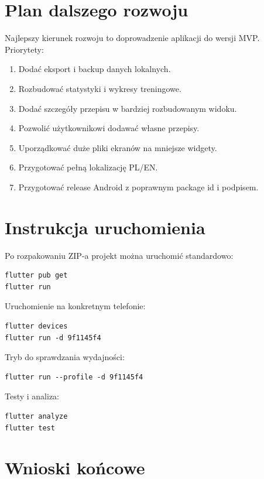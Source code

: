 \documentclass[12pt,a4paper]{article}
\begin{document}
\section{Plan dalszego rozwoju}

Najlepszy kierunek rozwoju to doprowadzenie aplikacji do wersji MVP. Priorytety:

\begin{enumerate}
    \item Dodać eksport i backup danych lokalnych.
    \item Rozbudować statystyki i wykresy treningowe.
    \item Dodać szczegóły przepisu w bardziej rozbudowanym widoku.
    \item Pozwolić użytkownikowi dodawać własne przepisy.
    \item Uporządkować duże pliki ekranów na mniejsze widgety.
    \item Przygotować pełną lokalizację PL/EN.
    \item Przygotować release Android z poprawnym package id i podpisem.
\end{enumerate}

\section{Instrukcja uruchomienia}

Po rozpakowaniu ZIP-a projekt można uruchomić standardowo:

\begin{verbatim}
flutter pub get
flutter run
\end{verbatim}

Uruchomienie na konkretnym telefonie:

\begin{verbatim}
flutter devices
flutter run -d 9f1145f4
\end{verbatim}

Tryb do sprawdzania wydajności:

\begin{verbatim}
flutter run --profile -d 9f1145f4
\end{verbatim}

Testy i analiza:

\begin{verbatim}
flutter analyze
flutter test
\end{verbatim}

\section{Wnioski końcowe}
\end{document}
